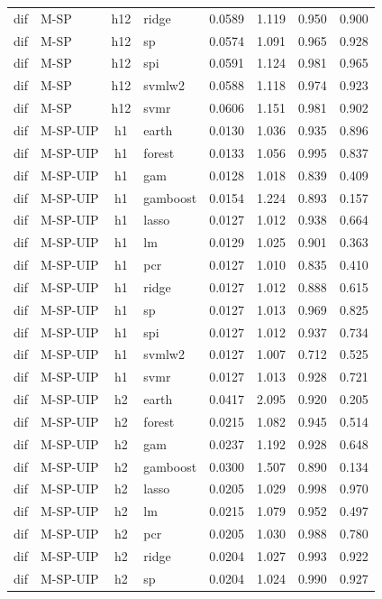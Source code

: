 \begin{ThreePartTable}
\begin{longtable}[t]{llclcccc}
dif & M-SP & h12 & ridge & 0.0589 & 1.119 & 0.950 & 0.900\\
dif & M-SP & h12 & sp & 0.0574 & 1.091 & 0.965 & 0.928\\
dif & M-SP & h12 & spi & 0.0591 & 1.124 & 0.981 & 0.965\\
dif & M-SP & h12 & svmlw2 & 0.0588 & 1.118 & 0.974 & 0.923\\
dif & M-SP & h12 & svmr & 0.0606 & 1.151 & 0.981 & 0.902\\
\addlinespace
dif & M-SP-UIP & h1 & earth & 0.0130 & 1.036 & 0.935 & 0.896\\
dif & M-SP-UIP & h1 & forest & 0.0133 & 1.056 & 0.995 & 0.837\\
dif & M-SP-UIP & h1 & gam & 0.0128 & 1.018 & 0.839 & 0.409\\
dif & M-SP-UIP & h1 & gamboost & 0.0154 & 1.224 & 0.893 & 0.157\\
dif & M-SP-UIP & h1 & lasso & 0.0127 & 1.012 & 0.938 & 0.664\\
dif & M-SP-UIP & h1 & lm & 0.0129 & 1.025 & 0.901 & 0.363\\
dif & M-SP-UIP & h1 & pcr & 0.0127 & 1.010 & 0.835 & 0.410\\
dif & M-SP-UIP & h1 & ridge & 0.0127 & 1.012 & 0.888 & 0.615\\
dif & M-SP-UIP & h1 & sp & 0.0127 & 1.013 & 0.969 & 0.825\\
dif & M-SP-UIP & h1 & spi & 0.0127 & 1.012 & 0.937 & 0.734\\
dif & M-SP-UIP & h1 & svmlw2 & 0.0127 & 1.007 & 0.712 & 0.525\\
dif & M-SP-UIP & h1 & svmr & 0.0127 & 1.013 & 0.928 & 0.721\\
\addlinespace
dif & M-SP-UIP & h2 & earth & 0.0417 & 2.095 & 0.920 & 0.205\\
dif & M-SP-UIP & h2 & forest & 0.0215 & 1.082 & 0.945 & 0.514\\
dif & M-SP-UIP & h2 & gam & 0.0237 & 1.192 & 0.928 & 0.648\\
dif & M-SP-UIP & h2 & gamboost & 0.0300 & 1.507 & 0.890 & 0.134\\
dif & M-SP-UIP & h2 & lasso & 0.0205 & 1.029 & 0.998 & 0.970\\
dif & M-SP-UIP & h2 & lm & 0.0215 & 1.079 & 0.952 & 0.497\\
dif & M-SP-UIP & h2 & pcr & 0.0205 & 1.030 & 0.988 & 0.780\\
dif & M-SP-UIP & h2 & ridge & 0.0204 & 1.027 & 0.993 & 0.922\\
dif & M-SP-UIP & h2 & sp & 0.0204 & 1.024 & 0.990 & 0.927\\

\end{longtable}
\end{ThreePartTable}
